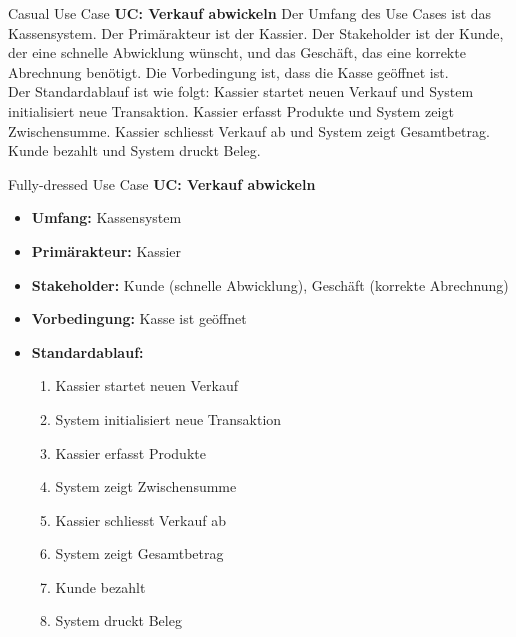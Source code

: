 
\begin{example2}{Casual Use Case}
\textbf{UC: Verkauf abwickeln}
Der Umfang des Use Cases ist das Kassensystem. Der Primärakteur ist der Kassier. 
Der Stakeholder ist der Kunde, der eine schnelle Abwicklung wünscht, und das Geschäft, das eine korrekte Abrechnung benötigt. 
Die Vorbedingung ist, dass die Kasse geöffnet ist.
\vspace{2mm}\\
Der Standardablauf ist wie folgt:
Kassier startet neuen Verkauf und System initialisiert neue Transaktion. Kassier erfasst Produkte und System zeigt Zwischensumme. 
Kassier schliesst Verkauf ab und System zeigt Gesamtbetrag. Kunde bezahlt und System druckt Beleg.
\end{example2}


\begin{example2}{Fully-dressed Use Case}
\textbf{UC: Verkauf abwickeln}
\begin{itemize}
    \item \textbf{Umfang:} Kassensystem
    \item \textbf{Primärakteur:} Kassier
    \item \textbf{Stakeholder:} Kunde (schnelle Abwicklung), Geschäft (korrekte Abrechnung)
    \item \textbf{Vorbedingung:} Kasse ist geöffnet
    \item \textbf{Standardablauf:}
    \begin{enumerate}
        \item Kassier startet neuen Verkauf
        \item System initialisiert neue Transaktion
        \item Kassier erfasst Produkte
        \item System zeigt Zwischensumme
        \item Kassier schliesst Verkauf ab
        \item System zeigt Gesamtbetrag
        \item Kunde bezahlt
        \item System druckt Beleg
    \end{enumerate}
\end{itemize}
\end{example2}

